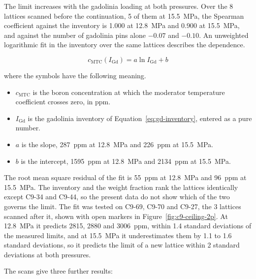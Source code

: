 The limit increases with the gadolinia loading at both pressures. Over
the 8 lattices scanned before the continuation, 5 of them at
\SI{15.5}{MPa}, the Spearman coefficient against the inventory is 1.000
at \SI{12.8}{MPa} and 0.900 at \SI{15.5}{MPa}, and against the number
of gadolinia pins alone $-0.07$ and $-0.10$. An unweighted logarithmic
fit in the inventory over the same lattices describes the dependence.

\begin{equation}
  c_\mathrm{MTC}(I_\mathrm{Gd}) = a \ln I_\mathrm{Gd} + b
  \label{eq:mtc-ceiling-fit}
\end{equation}

\noindent where the symbols have the following meaning.

\begin{itemize}
  \item $c_\mathrm{MTC}$ is the boron concentration at which the
        moderator temperature coefficient crosses zero, in ppm.
  \item $I_\mathrm{Gd}$ is the gadolinia inventory of
        Equation~\eqref{eq:gd-inventory}, entered as a pure number.
  \item $a$ is the slope, \SI{287}{ppm} at \SI{12.8}{MPa} and
        \SI{226}{ppm} at \SI{15.5}{MPa}.
  \item $b$ is the intercept, \SI{1595}{ppm} at \SI{12.8}{MPa} and
        \SI{2134}{ppm} at \SI{15.5}{MPa}.
\end{itemize}

The root mean square residual of the fit is \SI{55}{ppm} at
\SI{12.8}{MPa} and \SI{96}{ppm} at \SI{15.5}{MPa}. The inventory and
the weight fraction rank the lattices identically except C9-34 and
C9-44, so the present data do not show which of the two governs the
limit. The fit was tested on C9-69, C9-70 and C9-27, the 3 lattices
scanned after it, shown with open markers in
Figure~\ref{fig:c9-ceiling-2p}. At \SI{12.8}{MPa} it predicts 2815,
2880 and \SI{3006}{ppm}, within 1.4 standard deviations of the measured
limits, and at \SI{15.5}{MPa} it underestimates them by 1.1 to 1.6
standard deviations, so it predicts the limit of a new lattice within 2
standard deviations at both pressures.

The scans give three further results:

